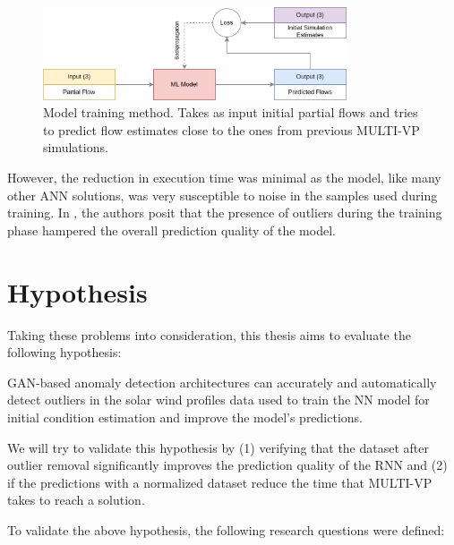 \begin{figure}[!ht]
    \centering
    \includegraphics[width=0.8\textwidth]{figures/rnn_training.png}
    \caption[ML training phase]{Model training method. Takes as input initial partial flows and tries to predict flow estimates close to the ones from previous MULTI-VP simulations.\label{fig:rnn_train}}
\end{figure}

However, the reduction in execution time was minimal as the model, like many other ANN solutions, was very susceptible to noise in the samples used during training. In \cite{barros_InitialConditionEstimation_}, the authors posit that the presence of outliers during the training phase hampered the overall prediction quality of the model.


\section{Hypothesis}\label{sec:hypothesis}
Taking these problems into consideration, this thesis aims to evaluate the following hypothesis:
\begin{adjustwidth}{2cm}{}
    GAN-based anomaly detection architectures can accurately and automatically detect outliers in the solar wind profiles data used to train the NN model for initial condition estimation and improve the model's predictions.
\end{adjustwidth}

We will try to validate this hypothesis by (1) verifying that the dataset after outlier removal significantly improves the prediction quality of the RNN and (2) if the predictions with a normalized dataset reduce the time that MULTI-VP takes to reach a solution.

To validate the above hypothesis, the following research questions were defined:

